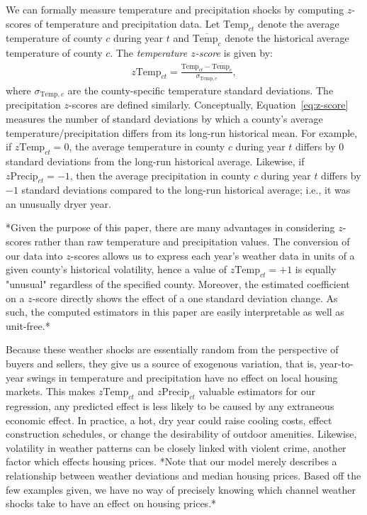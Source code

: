 \documentclass[12pt,reqno]{amsart}
\theoremstyle{definition}
\begin{document}
    We can formally measure temperature and precipitation shocks by computing $z$-scores of temperature and precipitation data. Let $\text{Temp}_{ct}$ denote the average temperature of county $c$ during year $t$ and $\overline{\text{Temp}_c}$ denote the historical average temperature of county $c$. The \textit{temperature $z$-score} is given by:
        \begin{equation}\label{eq:z-score}
        \begin{split}
            z\text{Temp}_{ct} = \frac{\text{Temp}_{ct} - \overline{\text{Temp}_c}}{\sigma_{\text{Temp},c}},
        \end{split}
        \end{equation} 
    where $\sigma_{\text{Temp},c}$ are the county-specific temperature standard deviations. The precipitation $z$-scores are defined similarly. Conceptually, Equation~\ref{eq:z-score} measures the number of standard deviations by which a county's average temperature/precipitation differs from its long-run historical mean. For example, if $z\text{Temp}_{ct} = 0$, the average temperature in county $c$ during year $t$ differs by $0$ standard deviations from the long-run historical average. Likewise, if $z\text{Precip}_{ct} = -1$, then the average precipitation in county $c$ during year $t$ differs by $-1$ standard deviations compared to the long-run historical average; i.e., it was an unusually dryer year.

    *Given the purpose of this paper, there are many advantages in considering $z$-scores rather than raw temperature and precipitation values. The conversion of our data into $z$-scores allows us to express each year's weather data in units of a given county's historical volatility, hence a value of $z\text{Temp}_{ct} = +1$ is equally "unusual" regardless of the specified county. Moreover, the estimated coefficient on a $z$-score directly shows the effect of a one standard deviation change. As such, the computed estimators in this paper are easily interpretable as well as unit-free.*

    Because these weather shocks are essentially random from the perspective of buyers and sellers, they give us a source of exogenous variation, that is, year-to-year swings in temperature and precipitation have no effect on local housing markets. This makes $z\text{Temp}_{ct}$ and $z\text{Precip}_{ct}$ valuable estimators for our regression, any predicted effect is less likely to be caused by any extraneous economic effect. In practice, a hot, dry year could raise cooling costs, effect construction schedules, or change the desirability of outdoor amenities. Likewise, volatility in weather patterns can be closely linked with violent crime, another factor which effects housing prices. *Note that our model merely describes a relationship between weather deviations and median housing prices. Based off the few examples given, we have no way of precisely knowing which channel weather shocks take to have an effect on housing prices.*
\end{document}
